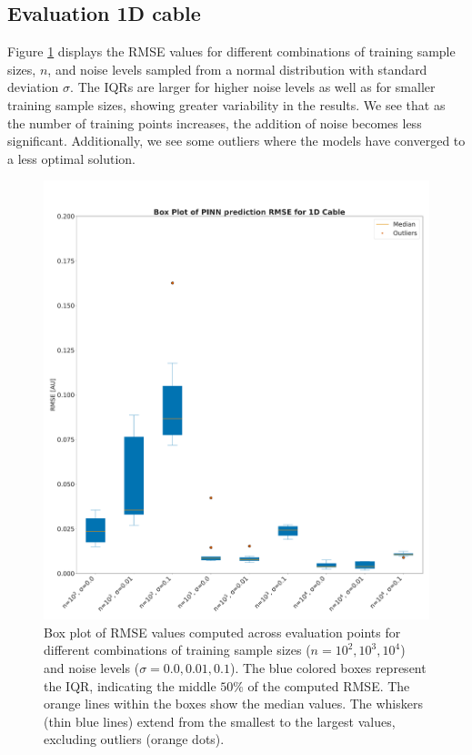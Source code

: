 \subsection{Evaluation 1D cable}
Figure \ref{fig:RMSE_1D} displays the RMSE values for different combinations of training sample sizes, $n$, and noise levels sampled from a normal distribution with standard deviation $\sigma$. The IQRs are larger for higher noise levels as well as for smaller training sample sizes, showing greater variability in the results. We see that as the number of training points increases, the addition of noise becomes less significant. Additionally, we see some outliers where the models have converged to a less optimal solution.
\begin{figure}[H]
  \centering
  \includegraphics[width=\textwidth]{Figs/1D/box_plot_1D_final.pdf}
  \caption{Box plot of RMSE values computed across evaluation points for different combinations of training sample sizes ($n=10^2,10^3,10^4$) and noise levels ($\sigma=0.0,0.01,0.1$). The blue colored boxes represent the IQR, indicating the middle $50\%$ of the computed RMSE. The orange lines within the boxes show the median values. The whiskers (thin blue lines) extend from the smallest to the largest values, excluding outliers (orange dots).}
  \label{fig:RMSE_1D}
\end{figure}

